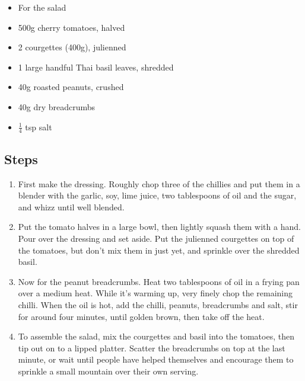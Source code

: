 \documentclass{book}
\begin{document}
\begin{itemize}
\item For the salad
\item 500g cherry tomatoes, halved
\item 2 courgettes (400g), julienned
\item 1 large handful Thai basil leaves, shredded
\item 40g roasted peanuts, crushed
\item 40g dry breadcrumbs
\item $\frac{1}{4}$ tsp salt
\end{itemize}

\subsection*{Steps}
\begin{enumerate}
\item First make the dressing. Roughly chop three of the chillies and put them in a blender with the garlic, soy, lime juice, two tablespoons of oil and the sugar, and whizz until well blended.
\item Put the tomato halves in a large bowl, then lightly squash them with a hand. Pour over the dressing and set aside. Put the julienned courgettes on top of the tomatoes, but don’t mix them in just yet, and sprinkle over the shredded basil.
\item Now for the peanut breadcrumbs. Heat two tablespoons of oil in a frying pan over a medium heat. While it’s warming up, very finely chop the remaining chilli. When the oil is hot, add the chilli, peanuts, breadcrumbs and salt, stir for around four minutes, until golden brown, then take off the heat.
\item To assemble the salad, mix the courgettes and basil into the tomatoes, then tip out on to a lipped platter. Scatter the breadcrumbs on top at the last minute, or wait until people have helped themselves and encourage them to sprinkle a small mountain over their own serving.
\end{enumerate}
\newpage
\end{document}
